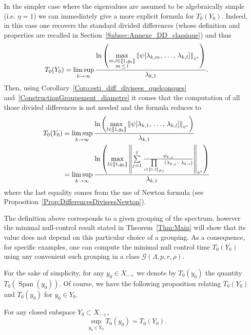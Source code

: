 \documentclass[AHL,Unicode,longabstracts]{cedram}
\newcommand{\llbracket}{\mathopen{[\mkern -2.7mu[}}
\newcommand{\rrbracket}{\mathclose{]\mkern -2.7mu]}}
\newcommand{\inter}[2]{\llbracket #1,#2 \rrbracket}
\newcommand{\interexclu}[3]{\llbracket #1,#2\rrbracket_{\neq #3}}
\newcommand{\Xmalpha}{X_{-\diamond}}
\newcommand{\Fzp}{Y_0}
\newcommand{\normeXalphas}[1]{\left\| #1 \right\|_{\diamond^*}}
\newcommand{\n}{g}
\DeclareMathOperator{\Span}{Span}
\begin{document}
In the simpler case where the eigenvalues are assumed to be algebraically simple (i.e. $\eta =1$) we can immediately give a more explicit formula for $T_0(\Fzp)$. Indeed, in this case one recovers the standard divided differences (whose definition and properties are recalled in Section~\ref{Subsec:Annexe_DD_classique}) and thus
\begin{equation}\label{Def:TempsMinimal_DifferencesDivisees_casgeneral}
T_0(\Fzp) = \limsup_{k\to \infty} \frac{\ln \left(\max\limits_{\substack{m,l\in \inter{1}{\n_k} \\ m\,\leq\,l}} \normeXalphas{ \psi[\lambda_{k,m},\,\dots,\,\lambda_{k,l}] } \right)}{\lambda_{k,1}}.
\end{equation}
Then, using Corollary~\ref{Coro:esti_diff_divisees_quelconques} and~\eqref{ConstructionGroupement_diametre} it comes that the computation of all those divided differences is not needed and the formula reduces to
\begin{align}\label{Def:TempsMinimal_DifferencesDivisees}
T_0 (\Fzp) &= \limsup_{k \to \infty} \frac{\ln \left(\max\limits_{l\in \inter{1}{\n_k}} \normeXalphas{ \psi[\lambda_{k,1},\, \dots,\,\lambda_{k,l}] } \right)}{\lambda_{k,1}}
\\
&=\limsup_{k\to \infty} \frac{\ln \left(\max\limits_{l\in \inter{1}{\n_k}} \normeXalphas{\sum\limits_{j=1}^l \frac{ \psi_{k,j} }{\prod\limits_{i\in \interexclu{1}{l}{j}} (\lambda_{k,j}-\lambda_{k,i})} } \right)}{\lambda_{k,1}}\label{Def:T0}
\end{align}
where the last equality comes from the use of Newton formula (see Proposition~\ref{Prop:DifferencesDiviseesNewton}).



\begin{rema}
The definition above corresponds to a given grouping of the spectrum, however the minimal null-control result stated in Theorem~\ref{Thm:Main} will show that its value does not depend on this particular choice of a grouping. As a consequence, for specific examples, one can compute the minimal null control time $T_0(\Fzp)$ using any convenient such grouping in a class $\mathcal{G}(\Lambda,p,r,\rho)$.
\end{rema}


For the sake of simplicity, for any $y_0 \in \Xmalpha$ we denote by $T_0(y_0)$ the quantity $T_0(\Span(y_0))$. Of course, we have the following proposition relating $T_0(\Fzp)$ and $T_0(y_0)$ for $y_0 \in \Fzp$.

\begin{prop}\label{Prop:Sup_TempsMinimaux}
For any closed subspace $\Fzp \subset \Xmalpha$,
\[
\sup_{y_0 \in \Fzp} T_0(y_0) = T_0(\Fzp).
\]
\end{prop}
\end{document}
